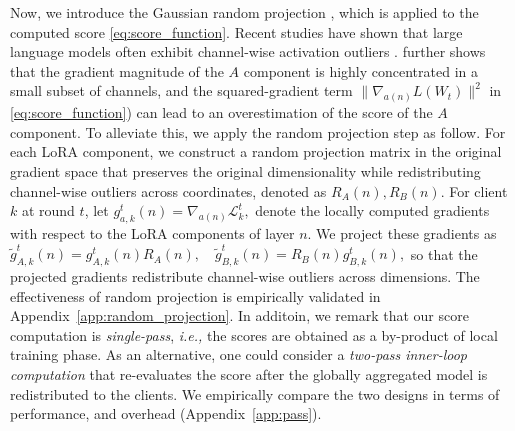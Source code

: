 Now, we introduce the Gaussian random projection \cite{johnson1984extensions}, which is applied to the computed score \eqref{eq:score_function}. Recent studies have shown that large language models often exhibit channel-wise activation outliers  \cite{xiao2023smoothquant, lin2024awq}. \cite{jung2025gralora} further shows that the gradient magnitude of the $A$ component is highly concentrated in a small subset of channels, and the squared-gradient term $\|\nabla_{a(n)} L(W_t)\|^2$ in \eqref{eq:score_function}) can lead to an overestimation of the score of the $A$ component. To alleviate this, we apply the random projection step as follow.
For each LoRA component, we construct a random projection matrix in the original gradient space that preserves the original dimensionality while redistributing channel-wise outliers across coordinates, denoted as
$
R_A(n), 
R_B(n).
$
For client $k$ at round $t$, let
$
g_{a,k}^t(n) = \nabla_{a(n)} \mathcal{L}_k^t, 
$
denote the locally computed gradients with respect to the LoRA components of layer $n$. 
We project these gradients as
$
\widetilde{g}_{A,k}^t(n) = g_{A,k}^t(n) R_A(n), \quad
\widetilde{g}_{B,k}^t(n) = R_B(n) g_{B,k}^t(n),
$
so that the projected gradients redistribute channel-wise outliers across dimensions. The effectiveness of random projection is empirically validated in Appendix~\ref{app:random_projection}. In additoin, we remark that our score computation is \emph{single-pass}, \emph{i.e.,} the scores are obtained as a by-product of local training phase. As an alternative, one could consider a \emph{two-pass inner-loop computation} that re-evaluates the score after the globally aggregated model is redistributed to the clients. We empirically compare the two designs in terms of performance, and overhead (Appendix~\ref{app:pass}).

